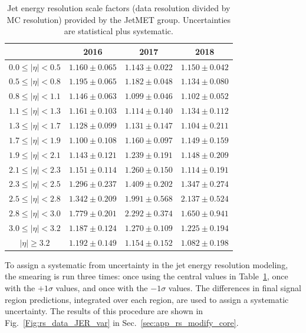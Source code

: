 \begin{table}[htp]
\caption{Jet energy resolution scale factors (data resolution divided by MC resolution) provided by the JetMET group.
             Uncertainties are statistical plus systematic.}
\label{tab:jrt_jersfs}
\centering
\begin{tabular}{|c|ccc|}
\hline
 & 2016 & 2017 & 2018 \\ \hline
$0.0 \leq |\eta| < 0.5$ & $1.160\pm0.065$ & $1.143\pm0.022$ & $1.150\pm0.042$ \\
$0.5 \leq |\eta| < 0.8$ & $1.195\pm0.065$ & $1.182\pm0.048$ & $1.134\pm0.080$ \\
$0.8 \leq |\eta| < 1.1$ & $1.146\pm0.063$ & $1.099\pm0.046$ & $1.102\pm0.052$ \\
$1.1 \leq |\eta| < 1.3$ & $1.161\pm0.103$ & $1.114\pm0.140$ & $1.134\pm0.112$ \\
$1.3 \leq |\eta| < 1.7$ & $1.128\pm0.099$ & $1.131\pm0.147$ & $1.104\pm0.211$ \\
$1.7 \leq |\eta| < 1.9$ & $1.100\pm0.108$ & $1.160\pm0.097$ & $1.149\pm0.159$ \\
$1.9 \leq |\eta| < 2.1$ & $1.143\pm0.121$ & $1.239\pm0.191$ & $1.148\pm0.209$ \\
$2.1 \leq |\eta| < 2.3$ & $1.151\pm0.114$ & $1.260\pm0.150$ & $1.114\pm0.191$ \\
$2.3 \leq |\eta| < 2.5$ & $1.296\pm0.237$ & $1.409\pm0.202$ & $1.347\pm0.274$ \\
$2.5 \leq |\eta| < 2.8$ & $1.342\pm0.209$ & $1.991\pm0.568$ & $2.137\pm0.524$ \\
$2.8 \leq |\eta| < 3.0$ & $1.779\pm0.201$ & $2.292\pm0.374$ & $1.650\pm0.941$ \\
$3.0 \leq |\eta| < 3.2$ & $1.187\pm0.124$ & $1.270\pm0.109$ & $1.225\pm0.194$ \\
$|\eta| \geq 3.2$       & $1.192\pm0.149$ & $1.154\pm0.152$ & $1.082\pm0.198$ \\
\hline
\end{tabular}
\end{table}

To assign a systematic from uncertainty in the jet energy resolution modeling, the smearing is run three times:
once using the central values in Table~\ref{tab:jrt_jersfs}, once with the $+1\sigma$ values,
and once with the $-1\sigma$ values. The differences in final signal region predictions,
integrated over each \Ht region, are used to assign a systematic uncertainty. The results of this
procedure are shown in Fig.~\ref{Fig:rs_data_JER_var} in Sec.~\ref{sec:app_rs_modify_core}.

